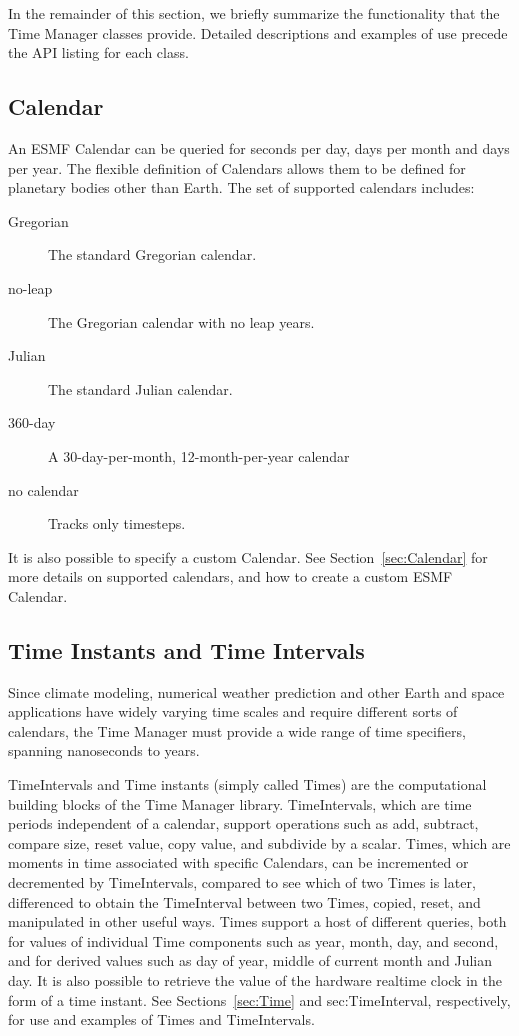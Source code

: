 In the remainder of this section, we briefly summarize the 
functionality that the Time Manager classes provide.  Detailed 
descriptions and examples of use precede the API listing for each 
class.

\subsection{Calendar}
An ESMF Calendar can be queried for seconds per day, days per month 
and days per year.  The flexible definition of Calendars allows them
to be defined for planetary bodies other than Earth.  The set of supported 
calendars includes:
\begin{description}
\item [Gregorian] The standard Gregorian calendar.
\item [no-leap] The Gregorian calendar with no leap years.
\item [Julian] The standard Julian calendar.
\item [360-day] A 30-day-per-month, 12-month-per-year calendar
\item [no calendar] Tracks only timesteps.
\end{description}
It is also possible to specify a custom Calendar.  See 
Section~\ref{sec:Calendar} for more details on supported calendars, 
and how to create a custom ESMF Calendar.

\subsection{Time Instants and Time Intervals}
Since climate modeling, numerical weather prediction and other 
Earth and space applications have widely varying time scales and require 
different sorts of calendars, the Time Manager must provide a wide range 
of time specifiers, spanning nanoseconds to years.  

TimeIntervals and Time instants (simply called Times) are the computational 
building blocks of the Time Manager library.  TimeIntervals, which are 
time periods independent of a calendar, support operations such as add, 
subtract, compare size, 
reset value, copy value, and subdivide by a scalar.  Times, which 
are moments in time associated with specific Calendars, can be incremented 
or decremented by TimeIntervals, compared to see which of two Times 
is later, differenced to obtain the TimeInterval between two Times, 
copied, reset, and manipulated in other useful ways.  Times support 
a host of different queries, both for values of individual Time 
components such as year, month, day, and second, and for derived values such 
as day of year, middle of current month and Julian day.  It is also possible 
to retrieve the value of the hardware realtime clock in the form of a time 
instant.  See Sections~\ref{sec:Time} and {sec:TimeInterval}, respectively,
for use and examples of Times and TimeIntervals.

